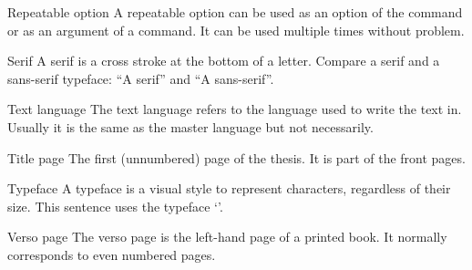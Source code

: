 \begin{termlist}
\item[Repeatable option \latex]
  A repeatable option can be used as an option of the 
  command or as an argument of a  command. It can be used
  multiple times without problem.
\item[Serif]
  A serif is a cross stroke at the bottom of a letter. Compare a serif and
  a sans-serif typeface: ``{\selectfont A serif}'' and
  ``{\selectfont A sans-serif}''.
\item[Text language]
  The text language refers to the language used to write the text in.
  Usually it is the same as the master language but not necessarily.
\item[Title page]
  The first (unnumbered) page of the thesis. It is part of the front pages.
\item[Typeface]
  A typeface is a visual style to represent characters, regardless of their
  size. This sentence uses the typeface `\rmfontname'. 
\item[Verso page]
  The verso page is the left-hand page of a printed book. It normally
  corresponds to even numbered pages.
\end{termlist}

